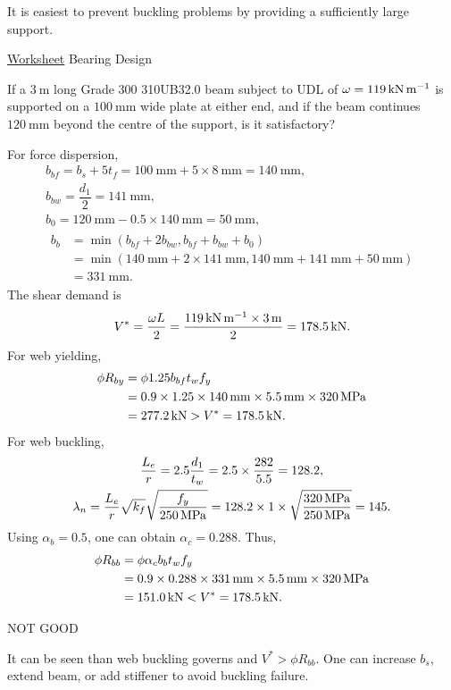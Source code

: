 It is easiest to prevent buckling problems by providing a sufficiently large support.
\begin{exmp}\href{run:./WORKSHEET/CH05/EX5.BUDL.sm}{Worksheet} Bearing Design

If a $\SI{3}{\meter}$ long Grade 300 310UB32.0 beam subject to UDL of $\omega=\SI{119}{\kilo\newton\per\meter}$ is supported on a $\SI{100}{\mm}$ wide plate at either end, and if the beam continues $\SI{120}{\mm}$ beyond the centre of the support, is it satisfactory?
\end{exmp}
\begin{solution}
\begin{figure}[H]

\end{figure}
For force dispersion,
\begin{gather*}
b_{bf}=b_s+5t_f=\SI{100}{\mm}+5\times\SI{8}{\mm}=\SI{140}{\mm},\\
b_{bw}=\dfrac{d_1}{2}=\SI{141}{\mm},\\
b_0=\SI{120}{\mm}-0.5\times\SI{140}{\mm}=\SI{50}{\mm},\\
\begin{split}
b_b&=\min\left(b_{bf}+2b_{bw},b_{bf}+b_{bw}+b_0\right)\\
&=\min\left(\SI{140}{\mm}+2\times\SI{141}{\mm},\SI{140}{\mm}+\SI{141}{\mm}+\SI{50}{\mm}\right)\\
&=\SI{331}{\mm}.
\end{split}
\end{gather*}
The shear demand is
\begin{gather*}
V^*=\dfrac{\omega{}L}{2}=\dfrac{\SI{119}{\kilo\newton\per\meter}\times\SI{3}{\meter}}{2}=\SI{178.5}{\kilo\newton}.
\end{gather*}
For web yielding,
\begin{align*}
\phi{}R_{by}&=\phi{}1.25b_{bf}t_wf_y\\
&=0.9\times1.25\times\SI{140}{\milli\meter}\times\SI{5.5}{\milli\meter}\times\SI{320}{\mega\pascal}\\
&=\SI{277.2}{\kilo\newton}>V^*=\SI{178.5}{\kilo\newton}.
\end{align*}
For web buckling,
\begin{gather*}
\dfrac{L_e}{r}=2.5\dfrac{d_1}{t_w}=2.5\times\dfrac{282}{5.5}=128.2,\\
\lambda_n=\dfrac{L_e}{r}\sqrt{k_f}\sqrt{\dfrac{f_y}{\SI{250}{\mega\pascal}}}=128.2\times1\times\sqrt{\dfrac{\SI{320}{\mega\pascal}}{\SI{250}{\mega\pascal}}}=145.
\end{gather*}
Using $\alpha_b=0.5$, one can obtain $\alpha_c=0.288$. Thus,
\begin{align*}
\phi{}R_{bb}&=\phi{}\alpha_cb_bt_wf_y\\
&=0.9\times0.288\times\SI{331}{\milli\meter}\times\SI{5.5}{\milli\meter}\times\SI{320}{\mega\pascal}\\
&=\SI{151.0}{\kilo\newton}<V^*=\SI{178.5}{\kilo\newton}.
\end{align*}
\begin{flushright}
NOT GOOD
\end{flushright}
It can be seen than web buckling governs and $V^*>\phi{}R_{bb}$. One can increase $b_s$, extend beam, or add stiffener to avoid buckling failure.
\end{solution}
